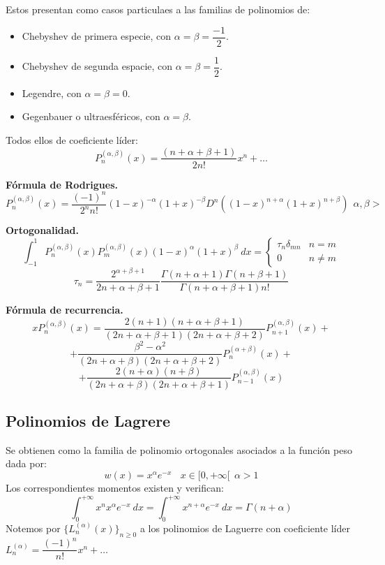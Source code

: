 \noindent
Estos presentan como casos particulaes a las familias de polinomios de:
\begin{itemize}
    \item Chebyshev de primera especie, con $\alpha = \beta = \dfrac{-1}{2}$.
    \item Chebyshev de segunda espacie, con $\alpha = \beta = \dfrac{1}{2}$.
    \item Legendre, con $\alpha = \beta = 0$.
    \item Gegenbauer o ultraesféricos, con $\alpha = \beta$.
\end{itemize}

\noindent
Todos ellos de coeficiente líder:
$$P_n^{(\alpha, \beta)}(x) = \dfrac{(n + \alpha + \beta + 1)}{2n!}x^n + \ldots$$

\noindent
\textbf{Fórmula de Rodrigues.}
$$P_n^{(\alpha, \beta)}(x) = \dfrac{(-1)^n}{2^nn!}(1-x)^{-\alpha}(1+x)^{-\beta}D^n((1-x)^{n+\alpha}(1+x)^{n+\beta})~~\alpha, \beta>$$

\noindent
\textbf{Ortogonalidad.}
$$\int_{-1}^1 P_n^{(\alpha,\beta)}(x) P_m^{(\alpha, \beta)}(x) (1-x)^\alpha(1+x)^\beta~dx = \left\{ \begin{array}{ll}
        \tau_n \delta_{mn} & n=m      \\
        0                  & n \neq m
    \end{array} \right.$$
$$\tau_n = \dfrac{2^{\alpha + \beta + 1}}{2n + \alpha + \beta + 1} \dfrac{\Gamma(n+ \alpha + 1) \Gamma(n+\beta + 1)}
    {\Gamma(n+\alpha + \beta + 1)n!}$$

\noindent
\textbf{Fórmula de recurrencia.}
$$xP_n^{(\alpha, \beta)}(x) = \dfrac{2(n+1)(n+\alpha + \beta + 1)}{(2n + \alpha + \beta +1)(2n + \alpha + \beta + 2)}P_{n+1}^{(\alpha,\beta)}(x) + $$
$$+ \dfrac{\beta^2-\alpha^2}{(2n+\alpha+\beta)(2n+\alpha+\beta+2)}P_n^{(\alpha + \beta)}(x) + $$
$$+ \dfrac{2(n+\alpha)(n+\beta)}{(2n+\alpha+\beta)(2n+\alpha+\beta+1)}P_{n-1}^{(\alpha,\beta)}(x)$$

\subsection{Polinomios de Lagrere}
\noindent
Se obtienen como la familia de polinomio ortogonales asociados a la función peso dada por:
$$w(x) = x^\alpha e^{-x}~~~~x \in [0,+\infty[~~\alpha >1$$
Los correspondientes momentos existen y verifican:
$$\int_0^{+\infty}x^nx^\alpha e^{-x}~dx = \int_0^{+\infty}x^{n+\alpha}e^{-x}~dx = \Gamma(n+\alpha)$$
Notemos por $\{L_n^{(\alpha)}(x)\}_{n\geq 0}$ a los polinomios de Laguerre con coeficiente líder $L_n^{(\alpha)} =
    \dfrac{(-1)^n}{n!}x^n + \ldots$

